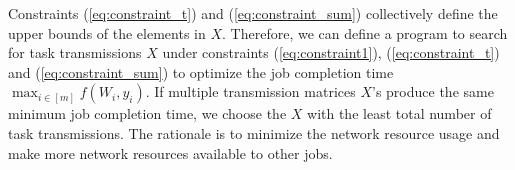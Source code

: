 Constraints (\ref{eq:constraint_t}) and (\ref{eq:constraint_sum}) collectively define the upper bounds of the elements in $X$. Therefore, we can define a program to search for task transmissions $X$ under constraints (\ref{eq:constraint1}), (\ref{eq:constraint_t}) and (\ref{eq:constraint_sum}) to optimize the job completion time $\max_{i \in [m]} f(W_i,y_i)$. %
If multiple transmission matrices $X$'s produce the same minimum job completion time, we choose the $X$ with the least total number of task transmissions. The rationale is to minimize the network resource usage and make more network resources available to other jobs.


